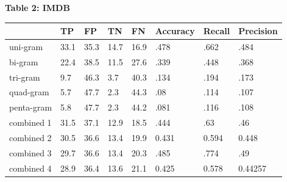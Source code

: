 \documentclass[12pt]{article}
\begin{document}
 \begin{table}[hbt!]


        
       \begin{center}
       \textbf{Table 2: IMDB} \\
       \end{center}
        \begin{tabular}{l|l|l|l|l|l|l|l|}
            \cline{2-7}
            
            \cline{2-7}
             & TP & FP & TN & FN  & Accuracy & Recall & Precision\\
            \hline
            \multicolumn{1}{|l|}{uni-gram} & 33.1 & 35.3 & 14.7 & 16.9 & .478 & .662  & .484 \\
            \hline
            \hline
            \multicolumn{1}{|l|}{bi-gram} & 22.4 & 38.5 & 11.5& 27.6 & .339 & .448 & .368  \\
            \hline
            \hline
            \multicolumn{1}{|l|}{tri-gram} & 9.7 & 46.3 & 3.7  & 40.3 &  .134  & .194  & .173 \\
            \hline
            \hline
            \multicolumn{1}{|l|}{quad-gram}& 5.7 & 47.7 & 2.3  & 44.3 &  .08  & .114  & .107 \\
            \hline
            \hline
            \multicolumn{1}{|l|}{penta-gram} & 5.8 & 47.7 & 2.3 & 44.2 & .081  & .116  & .108 \\
            \hline
            \hline
            \multicolumn{1}{|l|}{combined 1}& 31.5 & 37.1 & 12.9  & 18.5 & .444  & .63  & .46\\
            \hline
            \hline
            \multicolumn{1}{|l|}{combined 2} & 30.5 & 36.6 & 13.4  & 19.9 &  0.431   & 0.594  &  0.448 \\
            \hline
            \hline
            \multicolumn{1}{|l|}{combined 3} & 29.7 &36.6 & 13.4  &  20.3 & .485  & .774  & .49 \\
            \hline
            \hline
            \multicolumn{1}{|l|}{combined 4} & 28.9  & 36.4 & 13.6 & 21.1 & 0.425 & 0.578 & 0.44257\\
            \hline
\end{tabular}
        
\end{table}
    
\end{document}
